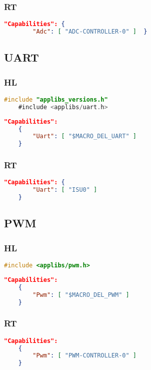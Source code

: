 \subsubsection{RT}
\begin{lstlisting}[language = json, firstnumber=0]	
	"Capabilities": {
		"Adc": [ "ADC-CONTROLLER-0" ]  }
\end{lstlisting}

\subsection{UART}
\subsubsection{HL}
\begin{lstlisting}[language = C, firstnumber=0]
	#include "applibs_versions.h"
	#include <applibs/uart.h>
\end{lstlisting}
\begin{lstlisting}[language = json, firstnumber=0]	
	"Capabilities": 
	{  
		"Uart": [ "$MACRO_DEL_UART" ] 
	}
\end{lstlisting}
\subsubsection{RT}
\begin{lstlisting}[language = json, firstnumber=0]	
	"Capabilities": {
		"Uart": [ "ISU0" ]
	}
\end{lstlisting}

\subsection{PWM}
\subsubsection{HL}
\begin{lstlisting}[language = C, firstnumber=0]
	#include <applibs/pwm.h>
\end{lstlisting}
\begin{lstlisting}[language = json, firstnumber=0]	
	"Capabilities": 
	{  
		"Pwm": [ "$MACRO_DEL_PWM" ] 
	}
\end{lstlisting}
\subsubsection{RT}
\begin{lstlisting}[language = json, firstnumber=0]	
	"Capabilities": 
	{  
		"Pwm": [ "PWM-CONTROLLER-0" ] 
	}
\end{lstlisting}

